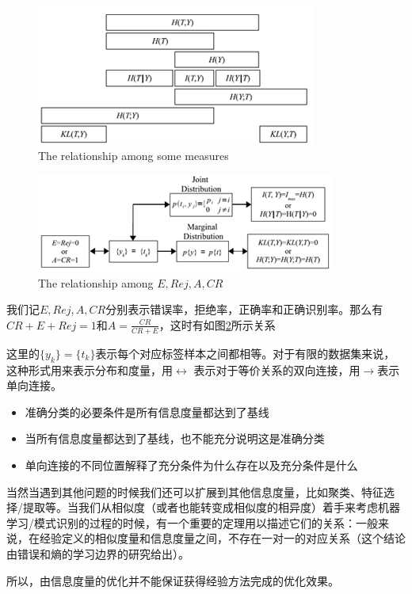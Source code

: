 \documentclass[11pt,fleqn, UTF8]{ctexbook} %
\begin{document}
\begin{figure}[t]
 \centering
 \includegraphics{pics/33.png}
 \caption{The relationship among some measures}
 \label{fig:3.3}
\end{figure}
\begin{figure}[t]
 \centering
 \includegraphics{pics/34.png}
 \caption{The relationship among $E,Rej,A,CR$}
 \label{fig:3.4}
\end{figure}

我们记$E,Rej,A,CR$分别表示错误率，拒绝率，正确率和正确识别率。那么有$CR+E+Rej=1$和$A=\frac{CR}{CR+E}$，这时有如图\ref{fig:3.4}所示关系\cite{mackay2003information}

这里的$\{y_k\}=\{t_k\}$表示每个对应标签样本之间都相等。对于有限的数据集来说，这种形式用来表示分布和度量，用$\leftrightarrow$ 表示对于等价关系的双向连接，用$\rightarrow$表示单向连接。
\begin{itemize}
  \item 准确分类的必要条件是所有信息度量都达到了基线
  \item 当所有信息度量都达到了基线，也不能充分说明这是准确分类
  \item 单向连接的不同位置解释了充分条件为什么存在以及充分条件是什么
\end{itemize}

当然当遇到其他问题的时候我们还可以扩展到其他信息度量，比如聚类、特征选择/提取等。当我们从相似度（或者也能转变成相似度的相异度）着手来考虑机器学习/模式识别的过程的时候，有一个重要的定理用以描述它们的关系：一般来说，在经验定义的相似度量和信息度量之间，不存在一对一的对应关系（这个结论由错误和熵的学习边界的研究给出）。

所以，由信息度量的优化并不能保证获得经验方法完成的优化效果。
\end{document}
